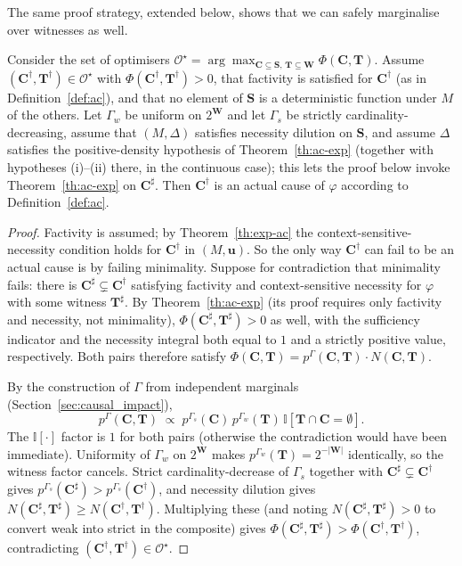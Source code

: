 The same proof strategy, extended below, shows that we can safely marginalise over
witnesses as well.

\begin{theorem}\label{th:local_max_to_ac}
Consider the set of optimisers
$\mathcal{O}^\star = \arg\max_{\mathbf{C}\subseteq\mathbf{S},\,\mathbf{T}\subseteq\mathbf{W}}
\Phi(\mathbf{C},\mathbf{T})$. Assume $(\mathbf{C}^\dagger,\mathbf{T}^\dagger)\in\mathcal{O}^\star$
with $\Phi(\mathbf{C}^\dagger,\mathbf{T}^\dagger)>0$, that factivity is satisfied for
$\mathbf{C}^\dagger$ (as in Definition~\ref{def:ac}), and that no element of
$\mathbf{S}$ is a deterministic function under $M$ of the others. Let
$\Gamma_w$ be uniform on $2^{\mathbf{W}}$ and let $\Gamma_s$ be strictly
cardinality-decreasing, assume that $(M,\Delta)$ satisfies necessity dilution on
$\mathbf{S}$, and assume $\Delta$ satisfies the positive-density hypothesis of
Theorem~\ref{th:ac-exp} (together with hypotheses (i)--(ii) there, in the continuous
case); this lets the proof below invoke Theorem~\ref{th:ac-exp} on
$\mathbf{C}^\sharp$. Then $\mathbf{C}^\dagger$ is an actual cause of $\varphi$
according to Definition~\ref{def:ac}.
\end{theorem}

\begin{proof}
Factivity is assumed; by Theorem~\ref{th:exp-ac} the context-sensitive-necessity
condition holds for $\mathbf{C}^\dagger$ in $(M,\mathbf{u})$. So the only way
$\mathbf{C}^\dagger$ can fail to be an actual cause is by failing minimality. Suppose
for contradiction that minimality fails: there is
$\mathbf{C}^\sharp\subsetneq\mathbf{C}^\dagger$ satisfying factivity and
context-sensitive necessity for $\varphi$ with some witness $\mathbf{T}^\sharp$. By
Theorem~\ref{th:ac-exp} (its proof requires only factivity and necessity, not
minimality), $\Phi(\mathbf{C}^\sharp,\mathbf{T}^\sharp)>0$ as well, with the
sufficiency indicator and the necessity integral both equal to $1$ and a strictly
positive value, respectively. Both pairs therefore satisfy
$\Phi(\mathbf{C},\mathbf{T}) = p^\Gamma(\mathbf{C},\mathbf{T})\cdot N(\mathbf{C},\mathbf{T})$.

By the construction of $\Gamma$ from independent marginals
(Section~\ref{sec:causal_impact}),
\[
p^\Gamma(\mathbf{C},\mathbf{T}) \;\propto\;
p^{\Gamma_s}(\mathbf{C})\,p^{\Gamma_w}(\mathbf{T})\,
\mathbb{I}[\mathbf{T}\cap\mathbf{C}=\emptyset].
\]
The $\mathbb{I}[\cdot]$ factor is $1$ for both pairs (otherwise the contradiction
would have been immediate). Uniformity of $\Gamma_w$ on $2^{\mathbf{W}}$ makes
$p^{\Gamma_w}(\mathbf{T})=2^{-|\mathbf{W}|}$ identically, so the witness factor cancels.
Strict cardinality-decrease of $\Gamma_s$ together with
$\mathbf{C}^\sharp\subsetneq\mathbf{C}^\dagger$ gives
$p^{\Gamma_s}(\mathbf{C}^\sharp)>p^{\Gamma_s}(\mathbf{C}^\dagger)$, and necessity
dilution gives $N(\mathbf{C}^\sharp,\mathbf{T}^\sharp)\geq
N(\mathbf{C}^\dagger,\mathbf{T}^\dagger)$. Multiplying these (and noting
$N(\mathbf{C}^\sharp,\mathbf{T}^\sharp)>0$ to convert weak into strict in the
composite) gives
$\Phi(\mathbf{C}^\sharp,\mathbf{T}^\sharp)>\Phi(\mathbf{C}^\dagger,\mathbf{T}^\dagger)$,
contradicting $(\mathbf{C}^\dagger,\mathbf{T}^\dagger)\in\mathcal{O}^\star$.
\end{proof}

